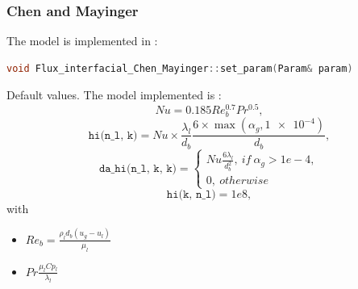 \subsubsection{Chen and Mayinger}
The model is implemented in :
\begin{lstlisting}[language=c++]
void Flux_interfacial_Chen_Mayinger::set_param(Param& param)
\end{lstlisting}
Default values.
The model implemented is :
\begin{equation}
        Nu=0.185Re_b^{0.7}Pr^{0.5},
\end{equation}
\begin{equation}
    \texttt{hi(n_l, k)} = Nu\times\frac{\lambda_l}{d_b} \frac{6\times \max(\alpha_g,\num{1e-4})}{d_b}, 
\end{equation}
\begin{equation}
\texttt{da\_hi(n_l, k, k)}= \begin{cases}
    Nu \frac{6\lambda_l}{d_b^2},\ if\ \alpha_g> 1e-4,\\ 0,\ otherwise
\end{cases}
\end{equation}
\begin{equation}
\texttt{hi(k, n_l)} = 1e8,
\end{equation}
with 
\begin{itemize}
    \item[\small \textcolor{blue}{\ding{109}}]$Re_b=\frac{\rho_l d_b (u_g-u_l)}{\mu_l}$
    \item[\small \textcolor{blue}{\ding{109}}]$Pr\frac{\mu_l Cp_l}{\lambda_l}$
\end{itemize}


